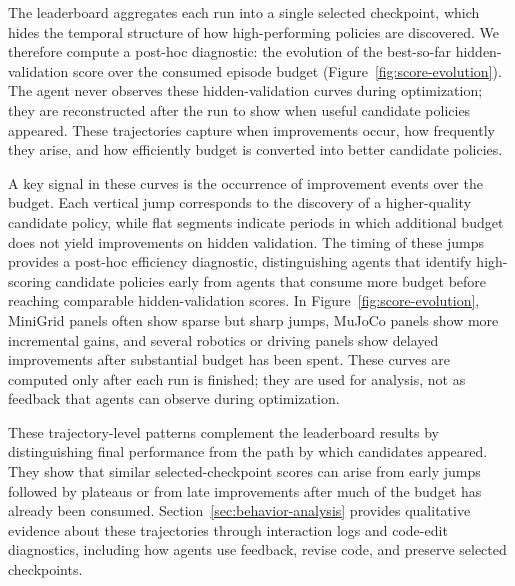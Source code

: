 The leaderboard aggregates each run into a single selected checkpoint, which
hides the temporal structure of how high-performing policies are discovered.
We therefore compute a post-hoc diagnostic: the evolution of the best-so-far
hidden-validation score over the consumed episode budget
(Figure~\ref{fig:score-evolution}). The agent never observes these
hidden-validation curves during optimization; they are reconstructed after the
run to show when useful candidate policies appeared. These trajectories capture
when improvements occur, how frequently they arise, and how efficiently budget
is converted into better candidate policies.


A key signal in these curves is the occurrence of improvement events over the
budget. Each vertical jump corresponds to the discovery of a higher-quality
candidate policy, while flat segments indicate periods in which additional
budget does not yield improvements on hidden validation. The timing of these
jumps provides a post-hoc efficiency diagnostic, distinguishing agents that
identify high-scoring candidate policies early from agents that consume more
budget before reaching comparable hidden-validation scores.
In Figure~\ref{fig:score-evolution}, MiniGrid panels often show sparse but
sharp jumps, MuJoCo panels show more incremental gains, and several robotics
or driving panels show delayed improvements after substantial budget has been
spent. These curves are computed only after each run is finished; they are used
for analysis, not as feedback that agents can observe during optimization.


These trajectory-level patterns complement the leaderboard results by
distinguishing final performance from the path by which candidates appeared.
They show that similar selected-checkpoint scores can arise from early jumps
followed by plateaus or from late improvements after much of the budget has
already been consumed. Section~\ref{sec:behavior-analysis} provides
qualitative evidence about these trajectories through interaction logs and
code-edit diagnostics, including how agents use feedback, revise code, and preserve selected checkpoints.


